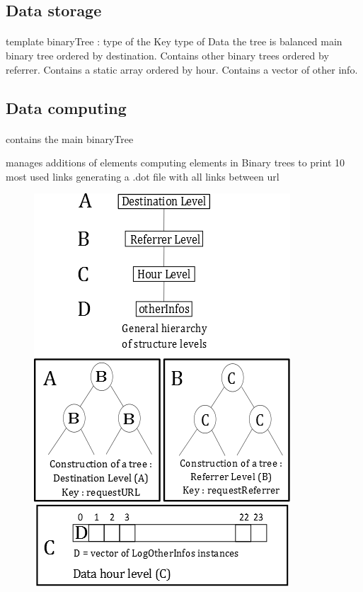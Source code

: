 \documentclass[a4paper, 12pts]{article}
\begin{document}
\subsection{Data storage}
\paragraph{}
 template binaryTree :
    type of the Key
    type of Data
    the tree is balanced
main binary tree ordered by destination. Contains other binary trees ordered by referrer. Contains a static array ordered by hour. Contains a vector of other info.
\subsection{Data computing}
\paragraph{}
 contains the main binaryTree

 manages additions of elements
 computing elements in Binary trees to print 10 most used links
 generating a .dot file with all links between url

\newpage

\begin{figure}[t]
\includegraphics{schemas structures.png}
\end{figure}
\end{document}
